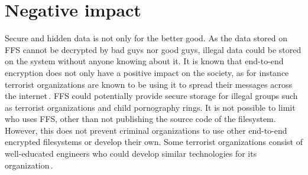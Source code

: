 \section{Negative impact}
Secure and hidden data is not only for the better good. As the data stored on FFS cannot be decrypted by bad guys nor good guys, illegal data could be stored on the system without anyone knowing about it. It is known that end-to-end encryption does not only have a positive impact on the society, as for instance terrorist organizations are known to be using it to spread their messages across the internet\,\cite{ruddEncryptionCounterterrorismGetting2017}. FFS could potentially provide secure storage for illegal groups such as terrorist organizations and child pornography rings. It is not possible to limit who uses FFS, other than not publishing the source code of the filesystem. However, this does not prevent criminal organizations to use other end-to-end encrypted filesystems or develop their own. Some terrorist organizations consist of well-educated engineers who could develop similar technologies for its organization\,\cite{berrebyEngineeringTerror2010}.